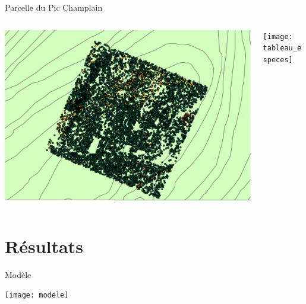 \documentclass{eecslides}
\begin{document}

	\begin{frame}{Parcelle du Pic Champlain}
		\begin{columns}
			\begin{column}{0.5\textwidth}
				\begin{center}
					\includegraphics[height=0.5\textheight]{carte_arbres}
				\end{center}
			\end{column}
			\begin{column}{0.5\textwidth}
				\begin{center}
					\texttt{[image: tableau\_especes]}
				\end{center}
			\end{column}
		\end{columns}	    	
	\end{frame}

\section{Résultats}

	\begin{frame}{Modèle}
		\begin{center}
			\texttt{[image: modele]}
		\end{center}
	\end{frame}
\end{document}
